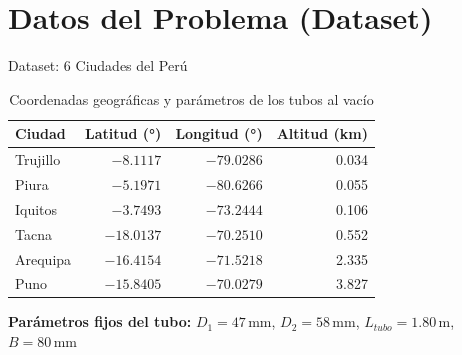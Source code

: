 \documentclass[10pt]{beamer}
\begin{document}
\section{Datos del Problema (Dataset)}
\begin{frame}{Dataset: 6 Ciudades del Perú}
  \small
  \begin{table}
    \centering
    \caption{Coordenadas geográficas y parámetros de los tubos al vacío}
    \begin{tabular}{lrrr}
      \toprule
      \textbf{Ciudad} & \textbf{Latitud (°)} & \textbf{Longitud (°)} & \textbf{Altitud (km)} \\
      \midrule
      Trujillo  & $-8.1117$  & $-79.0286$ & 0.034 \\
      Piura     & $-5.1971$  & $-80.6266$ & 0.055 \\
      Iquitos   & $-3.7493$  & $-73.2444$ & 0.106 \\
      Tacna     & $-18.0137$ & $-70.2510$ & 0.552 \\
      Arequipa  & $-16.4154$ & $-71.5218$ & 2.335 \\
      Puno      & $-15.8405$ & $-70.0279$ & 3.827 \\
      \bottomrule
    \end{tabular}
  \end{table}

  \vspace{0.2cm}
  \textbf{Parámetros fijos del tubo:}
  $D_1 = 47\,\text{mm}$, $D_2 = 58\,\text{mm}$,
  $L_{tubo} = 1.80\,\text{m}$, $B = 80\,\text{mm}$
\end{frame}

\end{document}
